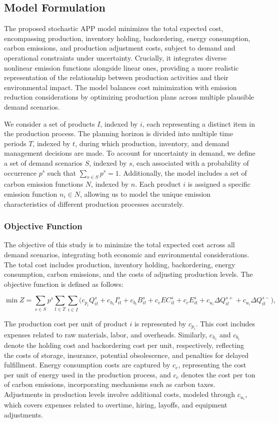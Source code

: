 \documentclass[final,3p,times,review,authoryear]{elsarticle}
\begin{document}
\subsection{Model Formulation}
The proposed stochastic APP model minimizes the total expected cost, encompassing production, inventory holding, backordering, energy consumption, carbon emissions, and production adjustment costs, subject to demand and operational constraints under uncertainty.  Crucially, it integrates diverse nonlinear emission functions alongside linear ones, providing a more realistic representation of the relationship between production activities and their environmental impact.  The model balances cost minimization with emission reduction considerations by optimizing production plans across multiple plausible demand scenarios.


We consider a set of products \( I \), indexed by \( i \), each representing a distinct item in the production process. The planning horizon is divided into multiple time periods \( T \), indexed by \( t \), during which production, inventory, and demand management decisions are made. To account for uncertainty in demand, we define a set of demand scenarios \( S \), indexed by \( s \), each associated with a probability of occurrence \( p^s \) such that \(\sum_{s \in S} p^s = 1\). Additionally, the model includes a set of carbon emission functions \( N \), indexed by \( n \). Each product \( i \) is assigned a specific emission function \( n_i \in N \), allowing us to model the unique emission characteristics of different production processes accurately.


\subsubsection{Objective Function}

The objective of this study is to minimize the total expected cost across all demand scenarios, integrating both economic and environmental considerations. The total cost includes production, inventory holding, backordering, energy consumption, carbon emissions, and the costs of adjusting production levels. The objective function is defined as follows:

\[
\min Z = \sum_{s \in S} p^s \sum_{t \in T} \sum_{i \in I} \Big( c_{p_i} Q_{it}^s + c_{h_i} I_{it}^s + c_{b_i} B_{it}^s + c_e EC_{it}^s + c_c E_{it}^s + c_{u_i} \Delta Q_{it}^{s+} + c_{u_i} \Delta Q_{it}^{s-} \Big),
\]

  The production cost per unit of product \( i \) is represented by \( c_{p_i} \). This cost includes expenses related to raw materials, labor, and overheads. Similarly, \( c_{h_i} \) and \( c_{b_i} \) denote the holding cost and backordering cost per unit, respectively, reflecting the costs of storage, insurance, potential obsolescence, and penalties for delayed fulfillment. Energy consumption costs are captured by \( c_e \), representing the cost per unit of energy used in the production process, and \( c_c \) denotes the cost per ton of carbon emissions, incorporating mechanisms such as carbon taxes. Adjustments in production levels involve additional costs, modeled through \( c_{u_i} \), which covers expenses related to overtime, hiring, layoffs, and equipment adjustments. 
\end{document}
